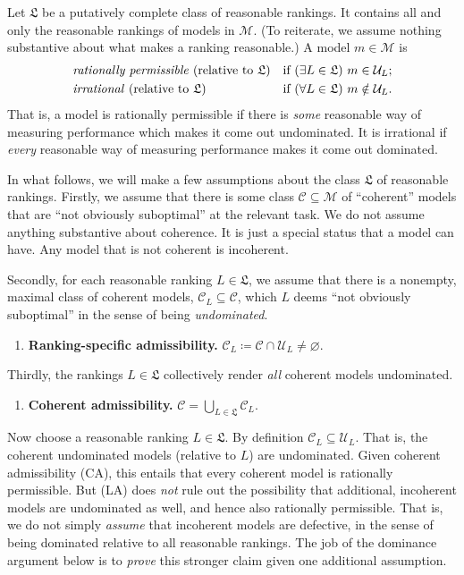 \documentclass[11pt]{article}
\theoremstyle{definition}
\theoremstyle{remark}
\newcommand{\M}{\mathcal M}
\newcommand{\C}{\mathcal C}
\newcommand{\U}{\mathcal U}
\newcommand{\Lf}{\mathfrak L}
\begin{document}
Let $\Lf$ be a putatively complete class of reasonable rankings. It contains all and only the reasonable rankings of models in $\M$. (To reiterate, we assume nothing substantive about what makes a ranking reasonable.) A model $m\in\M$ is
\begin{align*}
&\text{\emph{rationally permissible} (relative to $\Lf$)}&&\text{if }(\exists L\in\Lf)\ m\in\U_L;\\
&\text{\emph{irrational} (relative to $\Lf$)}&&\text{if }(\forall L\in\Lf)\ m\notin\U_L.
\end{align*}
That is, a model is rationally permissible if there is \textit{some} reasonable way of measuring performance which makes it come out undominated. It is irrational if \textit{every} reasonable way of measuring performance makes it come out dominated.


In what follows, we will make a few assumptions about the class $\Lf$ of reasonable rankings. Firstly, we assume that there is some class $\C\subseteq\M$ of ``coherent'' models that are ``not obviously suboptimal'' at the relevant task. We do not assume anything substantive about coherence. It is just a special status that a model can have. Any model that is not coherent is incoherent. 


Secondly, for each reasonable ranking $L\in\mathfrak L$, we assume that there is a nonempty, maximal class of coherent models, $\C_L\subseteq\C$, which $L$ deems ``not obviously suboptimal'' in the sense of being \textit{undominated}.
\begin{enumerate}[label=\textbf{(LA)},leftmargin=*]
\item \textbf{Ranking-specific admissibility.} $\C_L\coloneqq \C\cap\U_L\neq\varnothing$.
\end{enumerate}

Thirdly, the rankings $L\in\mathfrak L$ collectively render \textit{all} coherent models undominated.
\begin{enumerate}[label=\textbf{(CA)},leftmargin=*]
\item \textbf{Coherent admissibility.} $\C=\bigcup_{L\in\mathfrak L}\C_L$.
\end{enumerate}

Now choose a reasonable ranking $L\in\mathfrak L$. By definition $\C_L\subseteq\U_L$. That is, the coherent undominated models (relative to $L$) are undominated. Given coherent admissibility (CA), this entails that every coherent model is rationally permissible. But (LA) does \textit{not} rule out the possibility that additional, incoherent models are undominated as well, and hence also rationally permissible. That is, we do not simply \textit{assume} that incoherent models are defective, in the sense of being dominated relative to all reasonable rankings. The job of the dominance argument below is to \textit{prove} this stronger claim given one additional assumption.
\end{document}
